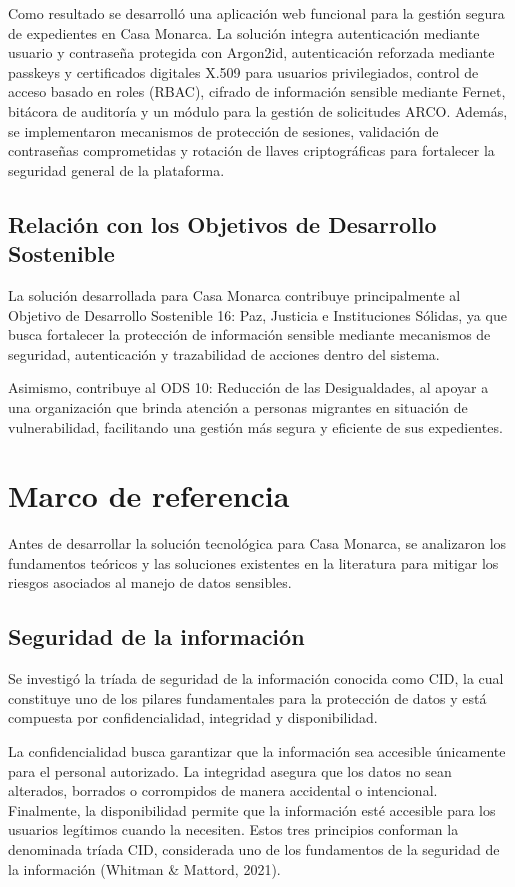 \documentclass[10pt, letterpaper]{article}
\begin{document}
Como resultado se desarrolló una aplicación web funcional para la gestión segura de expedientes en Casa Monarca. La solución integra autenticación mediante usuario y contraseña protegida con Argon2id, autenticación reforzada mediante passkeys y certificados digitales X.509 para usuarios privilegiados, control de acceso basado en roles (RBAC), cifrado de información sensible mediante Fernet, bitácora de auditoría y un módulo para la gestión de solicitudes ARCO. Además, se implementaron mecanismos de protección de sesiones, validación de contraseñas comprometidas y rotación de llaves criptográficas para fortalecer la seguridad general de la plataforma.

\subsection{Relación con los Objetivos de Desarrollo Sostenible}

La solución desarrollada para Casa Monarca contribuye principalmente al Objetivo de Desarrollo Sostenible 16: Paz, Justicia e Instituciones Sólidas, ya que busca fortalecer la protección de información sensible mediante mecanismos de seguridad, autenticación y trazabilidad de acciones dentro del sistema.

Asimismo, contribuye al ODS 10: Reducción de las Desigualdades, al apoyar a una organización que brinda atención a personas migrantes en situación de vulnerabilidad, facilitando una gestión más segura y eficiente de sus expedientes.

\section{Marco de referencia}

Antes de desarrollar la solución tecnológica para Casa Monarca, se analizaron los fundamentos teóricos y las soluciones existentes en la literatura para mitigar los riesgos asociados al manejo de datos sensibles.

\subsection{Seguridad de la información}

Se investigó la tríada de seguridad de la información conocida como CID, la cual constituye uno de los pilares fundamentales para la protección de datos y está compuesta por confidencialidad, integridad y disponibilidad.

La confidencialidad busca garantizar que la información sea accesible únicamente para el personal autorizado. La integridad asegura que los datos no sean alterados, borrados o corrompidos de manera accidental o intencional. Finalmente, la disponibilidad permite que la información esté accesible para los usuarios legítimos cuando la necesiten. Estos tres principios conforman la denominada tríada CID, considerada uno de los fundamentos de la seguridad de la información (Whitman \& Mattord, 2021).
\end{document}
